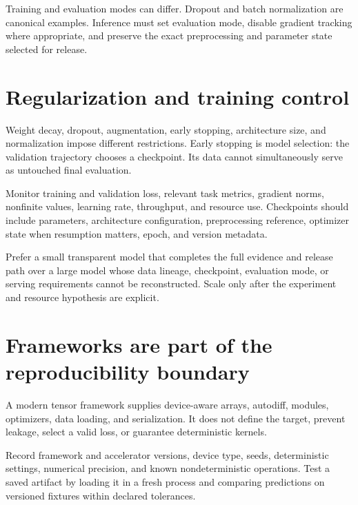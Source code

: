 \begin{warningbox}
Training and evaluation modes can differ. Dropout and batch normalization are
canonical examples. Inference must set evaluation mode, disable gradient
tracking where appropriate, and preserve the exact preprocessing and parameter
state selected for release.
\end{warningbox}

\section{Regularization and training control}

Weight decay, dropout, augmentation, early stopping, architecture size, and
normalization impose different restrictions. Early stopping is model selection:
the validation trajectory chooses a checkpoint. Its data cannot simultaneously
serve as untouched final evaluation.

Monitor training and validation loss, relevant task metrics, gradient norms,
nonfinite values, learning rate, throughput, and resource use. Checkpoints
should include parameters, architecture configuration, preprocessing reference,
optimizer state when resumption matters, epoch, and version metadata.

\begin{professionalbox}
Prefer a small transparent model that completes the full evidence and release
path over a large model whose data lineage, checkpoint, evaluation mode, or
serving requirements cannot be reconstructed. Scale only after the experiment
and resource hypothesis are explicit.
\end{professionalbox}

\section{Frameworks are part of the reproducibility boundary}

A modern tensor framework supplies device-aware arrays, autodiff, modules,
optimizers, data loading, and serialization. It does not define the target,
prevent leakage, select a valid loss, or guarantee deterministic kernels.

Record framework and accelerator versions, device type, seeds, deterministic
settings, numerical precision, and known nondeterministic operations. Test a
saved artifact by loading it in a fresh process and comparing predictions on
versioned fixtures within declared tolerances.

